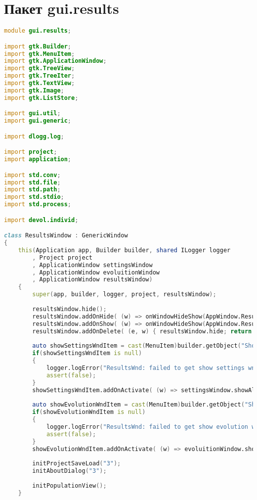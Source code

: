 \documentclass[russian,utf8,emptystyle]{eskdtext}
\begin{document}
\section{Пакет gui.results}
\begin{lstlisting}[language=D]
module gui.results;

import gtk.Builder;
import gtk.MenuItem;
import gtk.ApplicationWindow;
import gtk.TreeView;
import gtk.TreeIter;
import gtk.TextView;
import gtk.Image;
import gtk.ListStore;

import gui.util;
import gui.generic;

import dlogg.log;

import project;
import application;

import std.conv;
import std.file;
import std.path;
import std.stdio;
import std.process;

import devol.individ;

class ResultsWindow : GenericWindow
{  
    this(Application app, Builder builder, shared ILogger logger
        , Project project
        , ApplicationWindow settingsWindow
        , ApplicationWindow evoluitionWindow
        , ApplicationWindow resultsWindow)
    {
        super(app, builder, logger, project, resultsWindow);
        
        resultsWindow.hide();
        resultsWindow.addOnHide( (w) => onWindowHideShow(AppWindow.Results, true) );
        resultsWindow.addOnShow( (w) => onWindowHideShow(AppWindow.Results, false) );
        resultsWindow.addOnDelete( (e, w) { resultsWindow.hide; return true; } );
        
        auto showSettingsWndItem = cast(MenuItem)builder.getObject("ShowSettingsWndItem3");
        if(showSettingsWndItem is null)
        {
            logger.logError("ResultsWnd: failed to get show settings wnd item!");
            assert(false);
        }
        showSettingsWndItem.addOnActivate( (w) => settingsWindow.showAll() );
        
        auto showEvolutionWndItem = cast(MenuItem)builder.getObject("ShowEvolutionWndItem3");
        if(showEvolutionWndItem is null)
        {
            logger.logError("ResultsWnd: failed to get show evolution wnd item!");
            assert(false);
        }
        showEvolutionWndItem.addOnActivate( (w) => evoluitionWindow.showAll() );
        
        initProjectSaveLoad("3");
        initAboutDialog("3");
        
        initPopulationView();
    }
    

\end{lstlisting}
\end{document}
